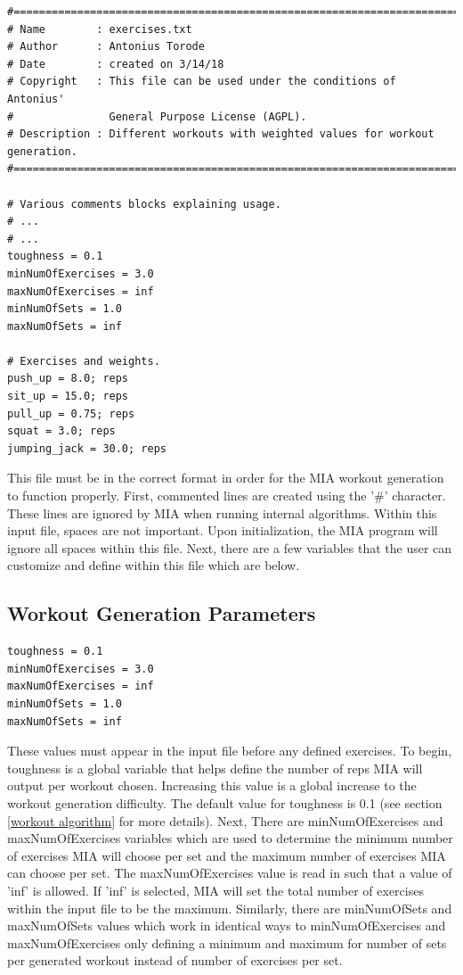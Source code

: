 \begin{lstlisting}
#============================================================================
# Name        : exercises.txt
# Author      : Antonius Torode
# Date        : created on 3/14/18
# Copyright   : This file can be used under the conditions of Antonius' 
#               General Purpose License (AGPL).
# Description : Different workouts with weighted values for workout generation.
#============================================================================

# Various comments blocks explaining usage.
# ...
# ...
toughness = 0.1
minNumOfExercises = 3.0
maxNumOfExercises = inf
minNumOfSets = 1.0
maxNumOfSets = inf

# Exercises and weights.
push_up = 8.0; reps
sit_up = 15.0; reps
pull_up = 0.75; reps
squat = 3.0; reps
jumping_jack = 30.0; reps
\end{lstlisting}

This file must be in the correct format in order for the MIA workout generation to function properly. First, commented lines are created using the '\#' character. These lines are ignored by MIA when running internal algorithms. Within this input file, spaces are not important. Upon initialization, the MIA program will ignore all spaces within this file. Next, there are a few variables that the user can customize and define within this file which are below.

\subsection{Workout Generation Parameters}

\begin{lstlisting}
toughness = 0.1
minNumOfExercises = 3.0
maxNumOfExercises = inf
minNumOfSets = 1.0
maxNumOfSets = inf
\end{lstlisting}

These values must appear in the input file before any defined exercises. To begin, toughness is a global variable that helps define the number of reps MIA will output per workout chosen. Increasing this value is a global increase to the workout generation difficulty. The default value for toughness is 0.1 (see section \ref{workout algorithm} for more details). Next, There are minNumOfExercises and maxNumOfExercises variables which are used to determine the minimum number of exercises MIA will choose per set and the maximum number of exercises MIA can choose per set. The maxNumOfExercises value is read in such that a value of 'inf' is allowed. If 'inf' is selected, MIA will set the total number of exercises within the input file to be the maximum. Similarly, there are minNumOfSets and maxNumOfSets values which work in identical ways to minNumOfExercises and maxNumOfExercises only defining a minimum and maximum for number of sets per generated workout instead of number of exercises per set. 

